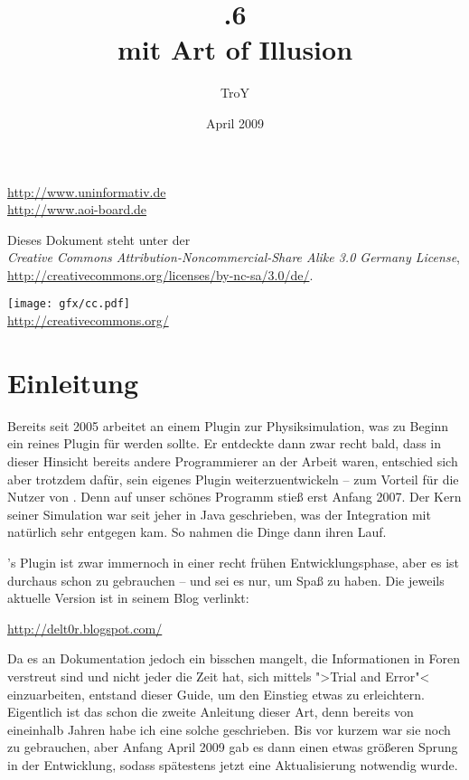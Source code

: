 \documentclass[10pt,DIV=14,a4paper]{scrartcl}
\begin{document}
\author{TroY}
\title{.6 \\ mit Art of Illusion}
\date{April 2009}
\maketitle
\thispagestyle{empty}

\vspace{120mm}

\begin{center}
	\url{http://www.uninformativ.de} \\
	\url{http://www.aoi-board.de}

	Dieses Dokument steht unter der \\
	\textit{Creative Commons Attribution-Noncommercial-Share Alike 3.0 Germany License}, \\
	\url{http://creativecommons.org/licenses/by-nc-sa/3.0/de/}.

	\texttt{[image: gfx/cc.pdf]} \\
	\url{http://creativecommons.org/}
\end{center}

\pagebreak

\tableofcontents
\thispagestyle{empty}
\pagebreak


\section{Einleitung}

Bereits seit 2005 arbeitet \deltor an einem Plugin zur Physiksimulation,
was zu Beginn ein reines Plugin für \blender werden sollte. Er entdeckte
dann zwar recht bald, dass in dieser Hinsicht bereits andere
Programmierer an der Arbeit waren, entschied sich aber trotzdem dafür,
sein eigenes Plugin weiterzuentwickeln -- zum Vorteil für die Nutzer von
\aoi. Denn auf unser schönes Programm stieß \deltor erst Anfang 2007.
Der Kern seiner Simulation war seit jeher in Java geschrieben, was der
Integration mit \aoi natürlich sehr entgegen kam. So nahmen die Dinge
dann ihren Lauf.

\deltor's Plugin ist zwar immernoch in einer recht frühen
Entwicklungsphase, aber es ist durchaus schon zu gebrauchen -- und sei
es nur, um Spaß zu haben. Die jeweils aktuelle Version ist in seinem
Blog verlinkt:

\url{http://delt0r.blogspot.com/}

Da es an Dokumentation jedoch ein bisschen mangelt, die Informationen in
Foren verstreut sind und nicht jeder die Zeit hat, sich mittels ">Trial
and Error"< einzuarbeiten, entstand dieser Guide, um den Einstieg etwas
zu erleichtern. Eigentlich ist das schon die zweite Anleitung dieser
Art, denn bereits von eineinhalb Jahren habe ich eine solche
geschrieben. Bis vor kurzem war sie noch zu gebrauchen, aber Anfang
April 2009 gab es dann einen etwas größeren Sprung in der Entwicklung,
sodass spätestens jetzt eine Aktualisierung notwendig wurde.
\end{document}
